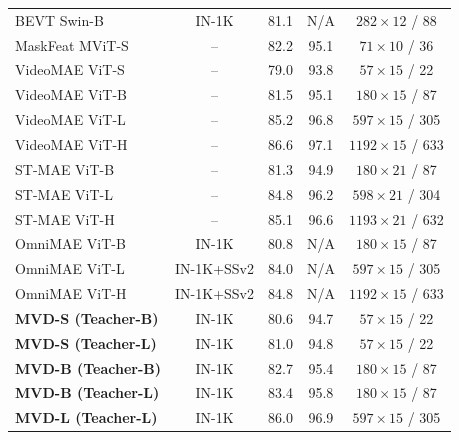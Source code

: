 \begin{enrichment}
\begin{enrichment}
\begin{table}[H]
{\begin{tabular}{lcccc}
                        BEVT Swin-B \cite{wang2022_bevt} & IN-1K & 81.1 & N/A & $282{\times}12$ / 88 \\
                        MaskFeat MViT-S \cite{wei2022_maskfeat} & -- & 82.2 & 95.1 & $71{\times}10$ / 36 \\
                        VideoMAE ViT-S \cite{tong2022_videomae} & -- & 79.0 & 93.8 & $57{\times}15$ / 22 \\
                        VideoMAE ViT-B \cite{tong2022_videomae} & -- & 81.5 & 95.1 & $180{\times}15$ / 87 \\
                        VideoMAE ViT-L \cite{tong2022_videomae} & -- & 85.2 & 96.8 & $597{\times}15$ / 305 \\
                        VideoMAE ViT-H \cite{tong2022_videomae} & -- & 86.6 & 97.1 & $1192{\times}15$ / 633 \\
                        ST-MAE ViT-B \cite{feichtenhofer2022_mae_st} & -- & 81.3 & 94.9 & $180{\times}21$ / 87 \\
                        ST-MAE ViT-L \cite{feichtenhofer2022_mae_st} & -- & 84.8 & 96.2 & $598{\times}21$ / 304 \\
                        ST-MAE ViT-H \cite{feichtenhofer2022_mae_st} & -- & 85.1 & 96.6 & $1193{\times}21$ / 632 \\
                        OmniMAE ViT-B \cite{girdhar2023_omnimae} & IN-1K & 80.8 & N/A & $180{\times}15$ / 87 \\
                        OmniMAE ViT-L \cite{girdhar2023_omnimae} & IN-1K+SSv2 & 84.0 & N/A & $597{\times}15$ / 305 \\
                        OmniMAE ViT-H \cite{girdhar2023_omnimae} & IN-1K+SSv2 & 84.8 & N/A & $1192{\times}15$ / 633 \\
                        \midrule
                        \textbf{MVD-S (Teacher-B)} \cite{wang2023_mvd} & IN-1K & {80.6} & 94.7 & $57{\times}15$ / 22 \\
                        \textbf{MVD-S (Teacher-L)} \cite{wang2023_mvd} & IN-1K & {81.0} & 94.8 & $57{\times}15$ / 22 \\
                        \textbf{MVD-B (Teacher-B)} \cite{wang2023_mvd} & IN-1K & {82.7} & 95.4 & $180{\times}15$ / 87 \\
                        \textbf{MVD-B (Teacher-L)} \cite{wang2023_mvd} & IN-1K & {83.4} & 95.8 & $180{\times}15$ / 87 \\
                        \textbf{MVD-L (Teacher-L)} \cite{wang2023_mvd} & IN-1K & {86.0} & 96.9 & $597{\times}15$ / 305 \\

\end{tabular}}
\end{table}
\end{enrichment}
\end{enrichment}

